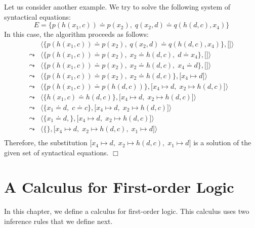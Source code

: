 \noindent
Let us consider another example.  We try to solve the following system of syntactical equations:
\[ E = \big\{ p(h(x_1,c)) \doteq p(x_2),\; q(x_2, d) \doteq q(h(d,c),x_4) \big\} \]
In this case, the algorithm proceeds as follows:
$$
\begin{array}{ll}
          & \big\langle \big\{ p(h(x_1,c)) \doteq p(x_2),\; q(x_2, d) \doteq q(h(d,c),x_4) \big\}, \big[ \big] \big\rangle \\[0.2cm]
 \leadsto & \big\langle \big\{ p(h(x_1,c)) \doteq p(x_2),\; x_2 \doteq h(d,c), \; d \doteq x_4 \big\}, \big[ \big] \big\rangle \\[0.2cm]
 \leadsto & \big\langle \big\{ p(h(x_1,c)) \doteq p(x_2),\; x_2 \doteq h(d,c), \; x_4 \doteq d \big\}, \big[ \big] \big\rangle \\[0.2cm]
 \leadsto & \big\langle \big\{ p(h(x_1,c)) \doteq p(x_2),\; x_2 \doteq h(d,c) \big\}, \big[ x_4 \mapsto d \big] \big\rangle \\[0.2cm]
 \leadsto & \big\langle \big\{ p(h(x_1,c)) \doteq p(h(d,c)) \big\}, \big[ x_4 \mapsto d,\; x_2 \mapsto h(d,c) \big] \big\rangle \\[0.2cm]
 \leadsto & \big\langle \big\{ h(x_1,c) \doteq h(d,c) \big\}, \big[ x_4 \mapsto d,\; x_2 \mapsto h(d,c) \big] \big\rangle \\[0.2cm]
 \leadsto & \big\langle \big\{ x_1 \doteq d,\; c \doteq c \big\}, \big[ x_4 \mapsto d,\; x_2 \mapsto h(d,c) \big] \big\rangle \\[0.2cm]
 \leadsto & \big\langle \big\{ x_1 \doteq d,\big\}, \big[ x_4 \mapsto d,\; x_2 \mapsto h(d,c) \big] \big\rangle \\[0.2cm]
 \leadsto & \big\langle \big\{\big\}, \big[ x_4 \mapsto d,\; x_2 \mapsto h(d,c),\; x_1 \mapsto d \big] \big\rangle \\[0.2cm]
\end{array}
$$
Therefore, the substitution  $\big[ x_4 \mapsto d,\; x_2 \mapsto h(d,c),\; x_1 \mapsto d \big]$ is a solution
of the given set of syntactical equations.  \hspace*{\fill} $\Box$
\pagebreak


\section{A Calculus for First-order Logic}
In this chapter, we define a calculus for first-order logic.  This calculus uses two inference rules that
we define next.

